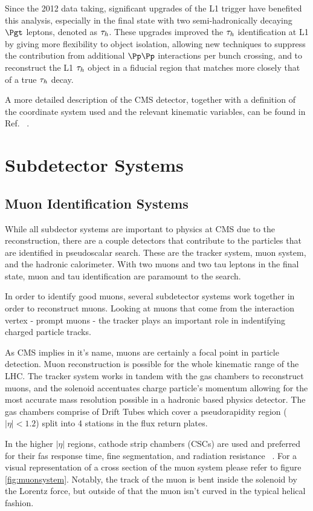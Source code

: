 Since the 2012 data taking, significant upgrades of the L1 trigger 
have benefited this analysis, especially in the final state with two semi-hadronically decaying 
$\Pgt$ leptons, denoted as $\tau_h$.  
These upgrades improved the $\tau_h$ identification at L1 by giving more flexibility 
to object isolation, allowing new techniques to suppress the contribution from 
additional $\Pp\Pp$ interactions per bunch
crossing, and to reconstruct the L1 $\tau_h$ object in a fiducial region that matches 
more closely that of a true $\tau_h$ decay.

A more detailed description of the CMS detector, 
together with a definition of the coordinate system used and 
the relevant kinematic variables, can be found in Ref. ~\cite{Chatrchyan:2008zzk}.


\section{Subdetector Systems}
\subsection{Muon Identification Systems}
While all subdector systems are important to physics at CMS due to the reconstruction, there are a couple detectors that contribute to the particles that are identified in pseudoscalar search. These are the tracker system, muon system, and the hadronic calorimeter. With two muons and two tau leptons in the final state, muon and tau identification are paramount to the search. 

In order to identify good muons, several subdetector systems work together in order to reconstruct muons. Looking at muons that come from the interaction vertex - prompt muons - the tracker plays an important role in indentifying charged particle tracks. 

As CMS implies in it's name, muons are certainly a focal point in particle detection. Muon reconstruction is possible for the whole kinematic range of the LHC. The tracker system works in tandem with the gas chambers to reconstruct muons, and the solenoid accentuates charge particle's momentum allowing for the most accurate mass resolution possible in a hadronic based physics detector. The gas chambers comprise of Drift Tubes which cover a pseudorapidity region ($|\eta|<1.2$) split into 4 stations in the flux return plates. 

In the higher $|\eta|$ regions, cathode strip chambers (CSCs) are used and preferred for their fas response time, fine segmentation, and radiation resistance ~\cite{Chatrchyan:1129810}. For a visual representation of a cross section of the muon system please refer to figure \ref{fig:muonsystem}. Notably, the track of the muon is bent inside the solenoid by the Lorentz force, but outside of that the muon isn't curved in the typical helical fashion. 

